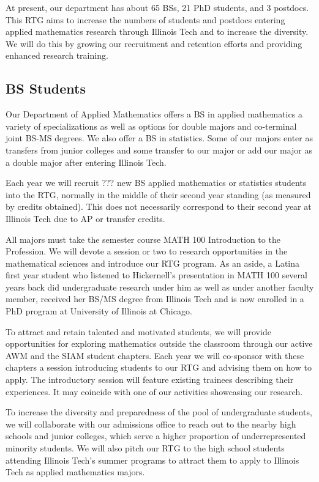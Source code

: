 \documentclass[11pt]{NSFamsart}
\newcommand{\numUG}{65\xspace}
\newcommand{\numPhD}{21\xspace}
\newcommand{\numPostDoc}{3\xspace}
\begin{document}
At present, our department has about \numUG BSs, \numPhD PhD students, and \numPostDoc postdocs.  This RTG aims to increase the numbers of students and postdocs entering applied mathematics research through Illinois Tech and to increase the diversity.  We will do this by growing our recruitment and retention efforts and providing enhanced research training.

\subsection*{BS Students}
Our Department of Applied Mathematics offers a BS in applied mathematics a variety of specializations as well as options for double majors and co-terminal joint BS-MS degrees. We also offer a BS in statistics.  Some of our majors enter as transfers from junior colleges and some transfer to our major or add our major as a double major after entering Illinois Tech.

Each year we will recruit ??? new BS applied mathematics or statistics students into the RTG, normally in the middle of their second year standing (as measured by credits obtained).  This does not necessarily correspond to their second year at Illinois Tech due to AP or transfer credits.

All majors must take the semester course MATH 100 Introduction to the Profession.  We will devote a session or two to research opportunities in the mathematical sciences and introduce our RTG program. As an aside, a Latina first year student who listened to Hickernell's presentation in MATH 100 several years back did undergraduate research under him as well as under another faculty member, received her BS/MS degree from Illinois Tech and is now enrolled in a PhD program at University of Illinois at Chicago.

To attract and retain talented and motivated students, we will provide opportunities for exploring mathematics outside the classroom through our active AWM and the SIAM student chapters.  Each year we will co-sponsor with these chapters a session introducing students to our RTG and advising them on how to apply.  The introductory session will feature existing trainees describing their experiences. It may coincide with one of our activities showcasing our research.

To increase the diversity and preparedness of the pool of undergraduate students, we will collaborate with our admissions office to reach out to the nearby high schools and junior colleges, which serve a higher proportion of underrepresented minority students.  We will also pitch our RTG to the high school students attending Illinois Tech's summer programs to attract them to apply to Illinois Tech as applied mathematics majors.
\end{document}
